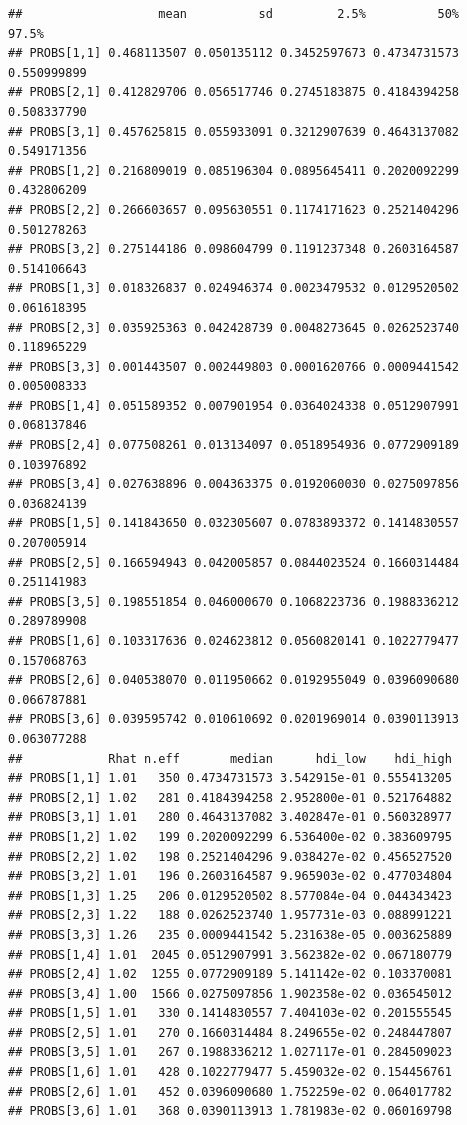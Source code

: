 \documentclass[]{article}
\begin{document}
\begin{verbatim}
##                   mean          sd         2.5%          50%       97.5%
## PROBS[1,1] 0.468113507 0.050135112 0.3452597673 0.4734731573 0.550999899
## PROBS[2,1] 0.412829706 0.056517746 0.2745183875 0.4184394258 0.508337790
## PROBS[3,1] 0.457625815 0.055933091 0.3212907639 0.4643137082 0.549171356
## PROBS[1,2] 0.216809019 0.085196304 0.0895645411 0.2020092299 0.432806209
## PROBS[2,2] 0.266603657 0.095630551 0.1174171623 0.2521404296 0.501278263
## PROBS[3,2] 0.275144186 0.098604799 0.1191237348 0.2603164587 0.514106643
## PROBS[1,3] 0.018326837 0.024946374 0.0023479532 0.0129520502 0.061618395
## PROBS[2,3] 0.035925363 0.042428739 0.0048273645 0.0262523740 0.118965229
## PROBS[3,3] 0.001443507 0.002449803 0.0001620766 0.0009441542 0.005008333
## PROBS[1,4] 0.051589352 0.007901954 0.0364024338 0.0512907991 0.068137846
## PROBS[2,4] 0.077508261 0.013134097 0.0518954936 0.0772909189 0.103976892
## PROBS[3,4] 0.027638896 0.004363375 0.0192060030 0.0275097856 0.036824139
## PROBS[1,5] 0.141843650 0.032305607 0.0783893372 0.1414830557 0.207005914
## PROBS[2,5] 0.166594943 0.042005857 0.0844023524 0.1660314484 0.251141983
## PROBS[3,5] 0.198551854 0.046000670 0.1068223736 0.1988336212 0.289789908
## PROBS[1,6] 0.103317636 0.024623812 0.0560820141 0.1022779477 0.157068763
## PROBS[2,6] 0.040538070 0.011950662 0.0192955049 0.0396090680 0.066787881
## PROBS[3,6] 0.039595742 0.010610692 0.0201969014 0.0390113913 0.063077288
##            Rhat n.eff       median      hdi_low    hdi_high
## PROBS[1,1] 1.01   350 0.4734731573 3.542915e-01 0.555413205
## PROBS[2,1] 1.02   281 0.4184394258 2.952800e-01 0.521764882
## PROBS[3,1] 1.01   280 0.4643137082 3.402847e-01 0.560328977
## PROBS[1,2] 1.02   199 0.2020092299 6.536400e-02 0.383609795
## PROBS[2,2] 1.02   198 0.2521404296 9.038427e-02 0.456527520
## PROBS[3,2] 1.01   196 0.2603164587 9.965903e-02 0.477034804
## PROBS[1,3] 1.25   206 0.0129520502 8.577084e-04 0.044343423
## PROBS[2,3] 1.22   188 0.0262523740 1.957731e-03 0.088991221
## PROBS[3,3] 1.26   235 0.0009441542 5.231638e-05 0.003625889
## PROBS[1,4] 1.01  2045 0.0512907991 3.562382e-02 0.067180779
## PROBS[2,4] 1.02  1255 0.0772909189 5.141142e-02 0.103370081
## PROBS[3,4] 1.00  1566 0.0275097856 1.902358e-02 0.036545012
## PROBS[1,5] 1.01   330 0.1414830557 7.404103e-02 0.201555545
## PROBS[2,5] 1.01   270 0.1660314484 8.249655e-02 0.248447807
## PROBS[3,5] 1.01   267 0.1988336212 1.027117e-01 0.284509023
## PROBS[1,6] 1.01   428 0.1022779477 5.459032e-02 0.154456761
## PROBS[2,6] 1.01   452 0.0396090680 1.752259e-02 0.064017782
## PROBS[3,6] 1.01   368 0.0390113913 1.781983e-02 0.060169798
\end{verbatim}
\end{document}
